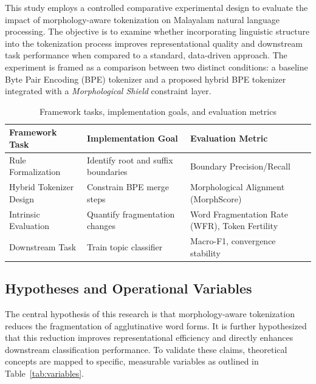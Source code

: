 \documentclass[12pt]{article}
\begin{document}
This study employs a controlled comparative experimental design to evaluate the impact of morphology-aware tokenization on Malayalam natural language processing. The objective is to examine whether incorporating linguistic structure into the tokenization process improves representational quality and downstream task performance when compared to a standard, data-driven approach. The experiment is framed as a comparison between two distinct conditions: a baseline Byte Pair Encoding (BPE) tokenizer and a proposed hybrid BPE tokenizer integrated with a \textit{Morphological Shield} constraint layer.

\begin{table}[H]
\centering
\renewcommand{\arraystretch}{1.3}
\begin{tabularx}{\textwidth}{l X X}
\toprule
\textbf{Framework Task} & \textbf{Implementation Goal} & \textbf{Evaluation Metric} \\
\midrule

Rule Formalization 
& Identify root and suffix boundaries 
& Boundary Precision/Recall \\

Hybrid Tokenizer Design 
& Constrain BPE merge steps 
& Morphological Alignment (MorphScore) \\

Intrinsic Evaluation 
& Quantify fragmentation changes 
& Word Fragmentation Rate (WFR), Token Fertility \\

Downstream Task 
& Train topic classifier 
& Macro-F1, convergence stability \\

\bottomrule
\end{tabularx}
\caption{Framework tasks, implementation goals, and evaluation metrics}
\end{table}

\subsection{Hypotheses and Operational Variables}

The central hypothesis of this research is that morphology-aware tokenization reduces the fragmentation of agglutinative word forms. It is further hypothesized that this reduction improves representational efficiency and directly enhances downstream classification performance. To validate these claims, theoretical concepts are mapped to specific, measurable variables as outlined in Table~\ref{tab:variables}.
\end{document}
